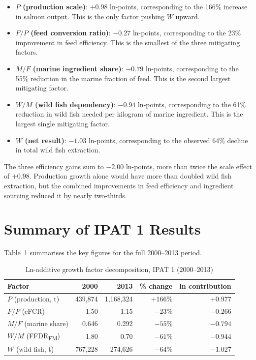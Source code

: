 \documentclass[12pt, a4paper]{report}
\begin{document}
\begin{itemize}
    \item \textbf{$P$ (production scale)}: $+0.98$ ln-points,
    corresponding to the 166\% increase in salmon output. This is the
    only factor pushing $W$ upward.
    \item \textbf{$F/P$ (feed conversion ratio)}: $-0.27$ ln-points,
    corresponding to the 23\% improvement in feed efficiency. This is
    the smallest of the three mitigating factors.
    \item \textbf{$M/F$ (marine ingredient share)}: $-0.79$ ln-points,
    corresponding to the 55\% reduction in the marine fraction of feed.
    This is the second largest mitigating factor.
    \item \textbf{$W/M$ (wild fish dependency)}: $-0.94$ ln-points,
    corresponding to the 61\% reduction in wild fish needed per kilogram
    of marine ingredient. This is the largest single mitigating factor.
    \item \textbf{$W$ (net result)}: $-1.03$ ln-points, corresponding
    to the observed 64\% decline in total wild fish extraction.
\end{itemize}

The three efficiency gains sum to $-2.00$ ln-points, more than twice
the scale effect of $+0.98$. Production growth alone would have more
than doubled wild fish extraction, but the combined improvements in feed
efficiency and ingredient sourcing reduced it by nearly two-thirds.

\section{Summary of IPAT 1 Results}

Table~\ref{tab:ipat1results} summarises the key figures for the full
2000--2013 period.

\begin{table}[H]
\centering
\caption{Ln-additive growth factor decomposition, IPAT 1 (2000--2013)}
\begin{tabular}{lrrrr}
\hline
\textbf{Factor} & \textbf{2000} & \textbf{2013} &
\textbf{\% change} & \textbf{ln contribution} \\
\hline
$P$ (production, t)       & 439,874  & 1,168,324 & $+166\%$ & $+0.977$ \\
$F/P$ (eFCR)               & 1.50     & 1.15      & $-23\%$  & $-0.266$ \\
$M/F$ (marine share)      & 0.646    & 0.292     & $-55\%$  & $-0.794$ \\
$W/M$ (FFDR\textsubscript{FM}) & 1.80 & 0.70      & $-61\%$  & $-0.944$ \\
\hline
$W$ (wild fish, t)        & 767,228  & 274,626   & $-64\%$  & $-1.027$ \\
\hline
\end{tabular}
\label{tab:ipat1results}
\end{table}
\end{document}
